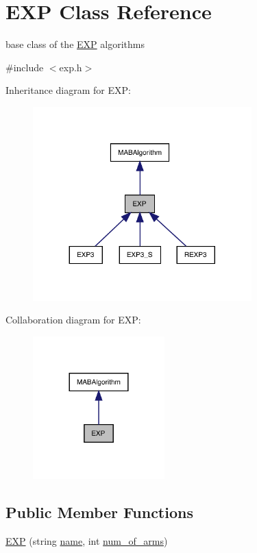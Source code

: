 \hypertarget{class_e_x_p}{}\section{E\+XP Class Reference}
\label{class_e_x_p}


base class of the \mbox{\hyperlink{class_e_x_p}{E\+XP}} algorithms  




{\ttfamily \#include $<$exp.\+h$>$}



Inheritance diagram for E\+XP\+:
\nopagebreak
\begin{figure}[H]
\begin{center}
\leavevmode
\includegraphics[width=239pt]{class_e_x_p__inherit__graph}
\end{center}
\end{figure}


Collaboration diagram for E\+XP\+:
\nopagebreak
\begin{figure}[H]
\begin{center}
\leavevmode
\includegraphics[width=144pt]{class_e_x_p__coll__graph}
\end{center}
\end{figure}
\subsection*{Public Member Functions}
\begin{DoxyCompactItemize}
\item 
\mbox{\hyperlink{class_e_x_p_a1ec218c13f58399e79bdca89f761c511}{E\+XP}} (string \mbox{\hyperlink{class_m_a_b_algorithm_a77b10ecc4b49d519c557f65358167b82}{name}}, int \mbox{\hyperlink{class_m_a_b_algorithm_a340fa9e83e85b092f2c6125fc4e8549b}{num\+\_\+of\+\_\+arms}})
\end{DoxyCompactItemize}
